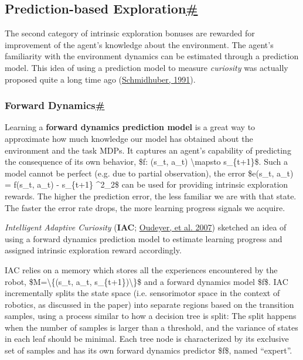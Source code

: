 \subsection{\texorpdfstring{Prediction-based Exploration\hyperref[prediction-based-exploration]{\#}}{Prediction-based Exploration\#}}\label{prediction-based-exploration}

The second category of intrinsic exploration bonuses are rewarded for improvement of the agent's knowledge about the environment. The agent's familiarity with the environment dynamics can be estimated through a prediction model. This idea of using a prediction model to measure \emph{curiosity} was actually proposed quite a long time ago (\href{http://citeseerx.ist.psu.edu/viewdoc/summary?doi=10.1.1.45.957}{Schmidhuber, 1991}).

\subsubsection{\texorpdfstring{Forward Dynamics\hyperref[forward-dynamics]{\#}}{Forward Dynamics\#}}\label{forward-dynamics}

Learning a \textbf{forward dynamics prediction model} is a great way to approximate how much knowledge our model has obtained about the environment and the task MDPs. It captures an agent's capability of predicting the consequence of its own behavior, \$f: (s\_t, a\_t) \textbackslash mapsto s\_\{t+1\}\$. Such a model cannot be perfect (e.g. due to partial observation), the error \$e(s\_t, a\_t) = \textbar{} f(s\_t, a\_t) - s\_\{t+1\} \textbar\^{}2\_2\$ can be used for providing intrinsic exploration rewards. The higher the prediction error, the less familiar we are with that state. The faster the error rate drops, the more learning progress signals we acquire.

\emph{Intelligent Adaptive Curiosity} (\textbf{IAC}; \href{http://citeseerx.ist.psu.edu/viewdoc/download?doi=10.1.1.177.7661&rep=rep1&type=pdf}{Oudeyer, et al. 2007}) sketched an idea of using a forward dynamics prediction model to estimate learning progress and assigned intrinsic exploration reward accordingly.

IAC relies on a memory which stores all the experiences encountered by the robot, \$M=\textbackslash\{(s\_t, a\_t, s\_\{t+1\})\textbackslash\}\$ and a forward dynamics model \$f\$. IAC incrementally splits the state space (i.e. sensorimotor space in the context of robotics, as discussed in the paper) into separate regions based on the transition samples, using a process similar to how a decision tree is split: The split happens when the number of samples is larger than a threshold, and the variance of states in each leaf should be minimal. Each tree node is characterized by its exclusive set of samples and has its own forward dynamics predictor \$f\$, named ``expert''.

